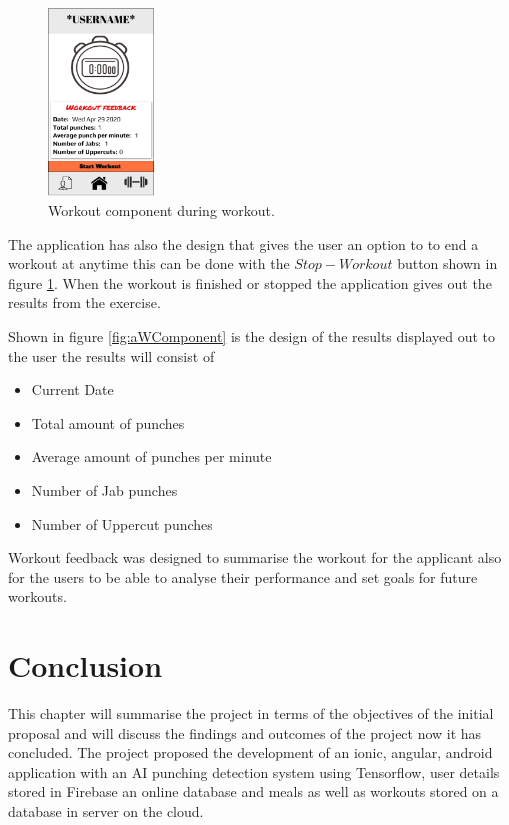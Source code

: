 \documentclass[a4paper,12pt]{report}
\begin{document}
\begin{figure}
\centering
\includegraphics[width=0.25\textwidth]{images/afterWorkout.png}
\caption{\label{fig:ipWComponent}Workout component during workout.}
\end{figure}




The application has also the design that gives the user an option to to end a workout at anytime this can be done with the $Stop-Workout$ button shown in figure \ref{fig:ipWComponent}.
When the workout is finished or stopped the application gives out the results from the exercise.

Shown in figure \ref{fig:aWComponent} is the design of the results displayed out to the user the results will consist of 
\begin{itemize}
    \item Current Date 
    \item Total amount of punches
    \item Average amount of punches per minute
    \item Number of Jab punches
    \item Number of Uppercut punches
\end{itemize}
Workout feedback was designed to summarise the workout for the applicant also for the users to be able to analyse their performance and set goals for future workouts. 




\chapter{Conclusion}
This chapter will summarise the project in terms of the objectives of
the initial proposal and will discuss the findings and outcomes of the
project now it has concluded.
The project proposed the development of an ionic, angular, android application
with an AI punching detection system using Tensorflow, user details stored in Firebase an online
database and meals as well as workouts stored on a database in server on the cloud.
\end{document}
